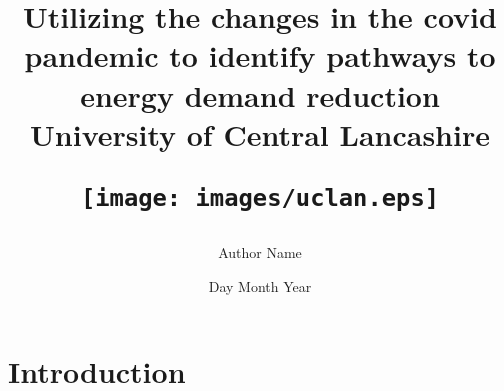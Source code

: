 \documentclass[report,11pt]{article}
\title{
\begin{center}
{Utilizing the changes in the covid pandemic to identify pathways to energy demand reduction}\\
{\large University of Central Lancashire}\\

\hfill

{\texttt{[image: images/uclan.eps]}}
\end{center}
}
\author{Author Name}
\date{Day Month Year}
\begin{document}
\maketitle
\newpage
%

%
\newpage




\tableofcontents

 \section{Introduction}
 
 
 
 
\end{document}
